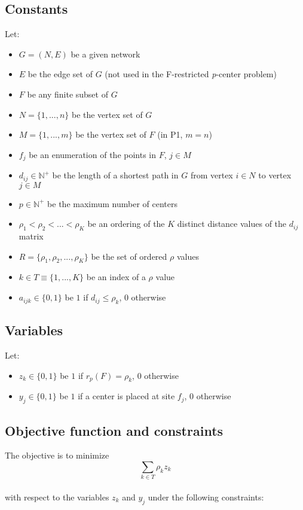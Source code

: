 \subsection{Constants}
Let:
\begin{itemize}
	\item $G = \left( N, E\right)$ be a given network
	\item $E$ be the edge set of $G$ (not used in the F-restricted \textit{p}-center problem)
	\item $F$ be any finite subset of $G$
	\item $N = \lbrace 1, ..., n\rbrace$ be the vertex set of $G$
	\item $M = \lbrace 1, ..., m\rbrace$ be the vertex set of $F$ (in P1, $m = n$)
	\item $f_j$ be an enumeration of the points in $F$, $j \in M$
	\item $d_{ij} \in \mathbb{N}^+$ be the length of a shortest path in $G$ from vertex $i \in N$ to vertex $j \in M$
	\item $p \in \mathbb{N}^+$ be the maximum number of centers
	\item $\rho_1 < \rho_2 < ... < \rho_K$ be an ordering of the $K$ distinct distance values of the $d_{ij}$ matrix
	\item $R = \lbrace \rho_1, \rho_2, ..., \rho_K \rbrace$ be the set of ordered $\rho$ values
	\item $k \in T \equiv \lbrace 1, ..., K\rbrace$ be an index of a $\rho$ value
	\item $a_{ijk} \in \lbrace 0, 1\rbrace$ be $1$ if $d_{ij} \leq \rho_k$, $0$ otherwise
\end{itemize}
\subsection{Variables}
Let:
\begin{itemize}
	\item $z_{k} \in \lbrace 0, 1\rbrace$ be $1$ if $r_p(F) = \rho_k$, $0$ otherwise
	\item $y_{j} \in \lbrace 0, 1\rbrace$ be $1$ if a center is placed at site $f_j$, $0$ otherwise
\end{itemize}
\subsection{Objective function and constraints}
The objective is to minimize\\ $$\sum\limits_{k \in T} \rho_k z_k$$\\ 
\newpage 
with respect to the variables $z_{k}$ and $y_{j}$ under the following constraints:\\

